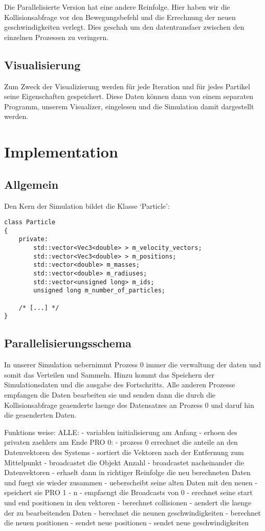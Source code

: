 Die Parallelisierte Version hat eine andere Reinfolge.
Hier haben wir die Kollisionsabfrage vor den Bewegungsbefehl und die Errechnung
der neuen geschwindigkeiten verlegt. Dies geschah um den datentransfaer zwischen
den einzelnen Prozessen zu veringern.

\subsection{Visualisierung}
Zum Zweck der Visualizierung werden für jede Iteration und für jedes Partikel seine
Eigenschaften gespeichert. Diese Daten können dann von einem separaten Programm,
unserem Visualizer, eingelesen und die Simulation damit dargestellt werden.


\section{Implementation}
\subsection{Allgemein}
Den Kern der Simulation bildet die Klasse `Particle':
\begin{verbatim}
class Particle
{
    private:
        std::vector<Vec3<double> > m_velocity_vectors;
        std::vector<Vec3<double> > m_positions;
        std::vector<double> m_masses;
        std::vector<double> m_radiuses;
        std::vector<unsigned long> m_ids;
        unsigned long m_number_of_particles;

    /* [...] */
}
\end{verbatim}

\subsection{Parallelisierungsschema}
In unserer Simulation uebernimmt Prozess 0 immer die verwaltung der daten und somit das Verteilen
und Sammeln. Hinzu kommt das Speichern der Simulationsdaten und die ausgabe des Fortschritts.
Alle anderen Prozesse empfangen die Daten bearbeiten sie und senden dann die
durch die Kollisionsabfrage geaenderte laenge des Datensatzes an Prozess 0
und daruf hin die geaenderten Daten.

Funktions weise:
   ALLE:
       - variablen initialisierung am Anfang
       - erhoen des privaten zaehlers am Ende
   PRO 0:
       - prozess 0 errechnet die anteile an den Datenvektoren des Systems
       - sortiert die Vektoren nach der Entfernung zum Mittelpunkt 
       - broadcastet die Objekt Anzahl
       - broadcastet nacheinander die Datenvektoren
       - erhaelt dann in richtiger Reinfolge die neu berechneten Daten und fuegt sie wieder zusammen
       - ueberscheibt seine alten Daten mit den neuen
       - speichert sie
   PRO 1 - n
       - empfaengt die Broadcasts von 0
       - erechnet seine start und end positionen in den vektoren
       - berechnet collisionen
       - aendert die laenge der zu bearbeitenden Daten
       - berechnet die neunen geschwindigkeiten
       - berechnet die neuen positionen
       - sendet neue positionen
       - sendet neue geschwindigkeiten

